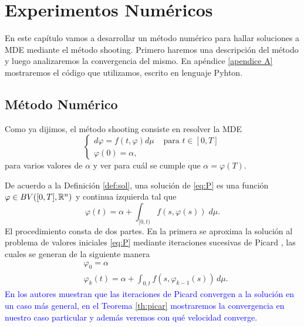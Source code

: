 \chapter{Experimentos Numéricos}

En este capítulo vamos a desarrollar un método numérico para hallar soluciones a MDE mediante el método shooting. Primero haremos una descripción del método y luego analizaremos la convergencia del mismo. En apéndice  \ref{apendice A} mostraremos el código que utilizamos, escrito en lenguaje Pyhton.

\section{Método Numérico }



Como ya dijimos, el método shooting consiste en resolver la MDE
\begin{equation}\label{eq:P}
\left\lbrace \begin{array}{lc}
d\varphi=f(t,\varphi) d\mu& \text{ para } t\in [0,T]\\
\varphi(0)=\alpha,
\end{array}\right. \tag{$P$}
\end{equation} 
para varios valores de $\alpha$ y ver para cuál se cumple que  $\alpha=\varphi(T)$.

De acuerdo a  la Definición \ref{def:sol},  una solución de \eqref{eq:P} es una función $\varphi\in  BV([0,T],\mathbb{R}^n)$ y continua izquierda tal que
\begin{equation}\label{eq:integral}
    \varphi(t)=\alpha+\int_{[0,t)}f(s,\varphi(s)) \;d\mu.
\end{equation}
El procedimiento consta de dos partes. En la primera se aproxima la solución al problema de valores iniciales \ref{eq:P} mediante iteraciones sucesivas de Picard \cite{Simmons}, las cuales se generan de la siguiente manera
\begin{equation*}
    \begin{split}
        &\varphi_0=\alpha\\
        &\varphi_k(t)=\alpha+\int_{0,t}f(s,\varphi_{k-1}(s)) \,d\mu.
    \end{split}
\end{equation*}
\textcolor{blue}{En \cite{P.Mazzone} los autores muestran que   las iteraciones de Picard convergen  a la solución en un caso más general, en el Teorema \ref{th:picar} mostraremos la convergencia en nuestro caso particular y además veremos con qué velocidad converge}. 

